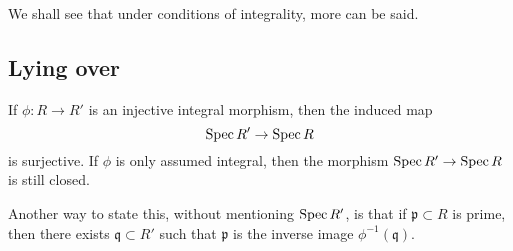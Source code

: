 We shall see that under conditions of integrality, more can be said.

\subsection{Lying over}

\begin{proposition}
If $\phi: R \to R'$ is an injective integral morphism, then the induced map
\[ \operatorname{Spec} R' \to \operatorname{Spec} R  \]
is surjective.
If $\phi$ is only assumed integral, then the morphism $\operatorname{Spec} R'\to \operatorname{Spec} R$ is
still closed.
\end{proposition}

Another way to state this, without mentioning $\operatorname{Spec} R'$, is that if
$\mathfrak{p} \subset R$ is prime, then there exists $\mathfrak{q} \subset R'$
such that $\mathfrak{p}$ is the inverse image $\phi^{-1}(\mathfrak{q})$.

